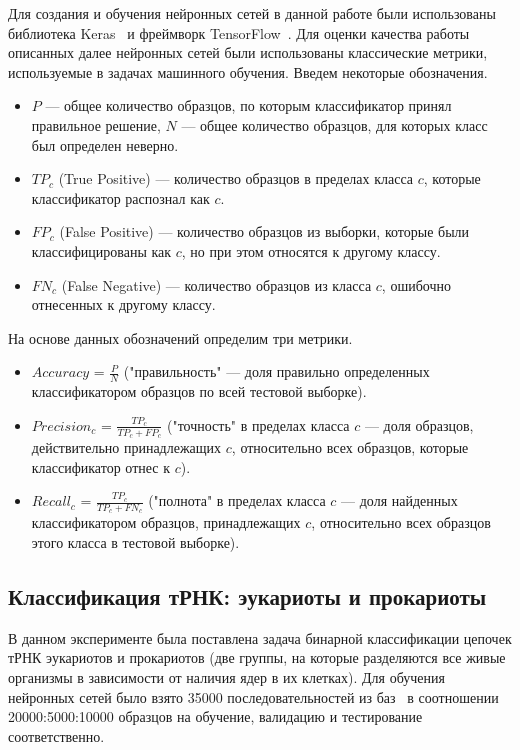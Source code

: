 \documentclass[14pt]{matmex-diploma-custom}
\begin{document}
Для создания и обучения нейронных сетей в данной работе были использованы библиотека Keras~\cite{keras} и фреймворк TensorFlow~\cite{tensorflow}.
Для оценки качества работы описанных далее нейронных сетей были использованы классические метрики, используемые в задачах машинного обучения. Введем некоторые обозначения.
\begin{itemize}
    \item $P$ --- общее количество образцов, по которым классификатор принял правильное решение, $N$ --- общее количество образцов, для которых класс был определен неверно.
    \item $TP_{c}$ (True Positive) --- количество образцов в пределах класса $c$, которые классификатор распознал как $c$.
    \item $FP_{c}$ (False Positive) --- количество образцов из выборки, которые были классифицированы как $c$, но при этом относятся к другому классу.
    \item $FN_{c}$ (False Negative) --- количество образцов из класса $c$, ошибочно отнесенных к другому классу.
\end{itemize}

На основе данных обозначений определим три метрики.
\begin{itemize}
    \item $Accuracy$ = $\frac{P}{N}$ ("правильность" --- доля правильно определенных классификатором образцов по всей тестовой выборке).
    \item $Precision_{c}$ = $\frac{TP_{c}}{TP_{c} + FP_{c}}$ ("точность" в пределах класса $c$ --- доля образцов, действительно принадлежащих $c$, относительно всех образцов, которые классификатор отнес к $c$).
    \item $Recall_{c}$ = $\frac{TP_{c}}{TP_{c} + FN_{c}}$  ("полнота" в пределах класса $c$ --- доля найденных классификатором образцов, принадлежащих $c$, относительно всех образцов этого класса в тестовой выборке).
\end{itemize}


\subsection{Классификация тРНК: эукариоты и прокариоты}
В данном эксперименте была поставлена задача бинарной классификации цепочек тРНК эукариотов и прокариотов (две группы, на которые разделяются все живые организмы в зависимости от наличия ядер в их клетках). Для обучения нейронных сетей было взято 35000 последовательностей из баз~\cite{trnadb1,trnadb2} в соотношении 20000:5000:10000  образцов на обучение, валидацию и тестирование соответственно.
\end{document}
